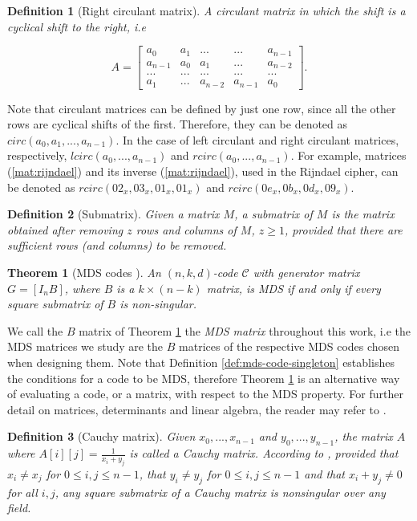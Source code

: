 \documentclass{report}
\newtheorem{definition}{Definition}{\bfseries}{\itshape}
\newtheorem{theorem}{Theorem}{\bfseries}{\itshape}
\begin{document}
\begin{definition}[Right circulant matrix]
A circulant matrix in which the shift is a cyclical shift to the right, i.e

$$
A = 
\begin{bmatrix}
a_0 & a_1 & ... & ... & a_{n-1}\\
a_{n-1} & a_0 & a_1 & ... & a_{n-2}\\
... & ... & ... & ... & ...\\
a_1 & ... & a_{n-2} & a_{n-1} & a_0
\end{bmatrix}.
$$
\end{definition}

Note that circulant matrices can be defined by just one row, since all the other rows are cyclical shifts of the first. Therefore, they can be denoted as $circ(a_0, a_1, ..., a_{n-1})$. In the case of left circulant and right circulant matrices, respectively, $lcirc(a_0, ..., a_{n-1})$ and $rcirc(a_0, ..., a_{n-1})$. For example, matrices (\ref{mat:rijndael}) and its inverse (\ref{mat:rijndael}), used in the Rijndael cipher, can be denoted as $rcirc(02_x, 03_x, 01_x, 01_x)$ and $rcirc(0e_x, 0b_x, 0d_x, 09_x)$.

\begin{definition}[Submatrix]
Given a matrix $M$, a submatrix of $M$ is the matrix obtained after removing $z$ rows and columns of $M$, $z \geq 1$, provided that there are sufficient rows (and columns) to be removed.
\end{definition}

\begin{theorem}[MDS codes \cite{SloaneBook}]\label{teo:mds}
An $(n, k, d)$-code $\mathcal{C}$ with generator matrix $G = [I_nB]$, where $B$ is a $k \times (n - k)$ matrix, is MDS if and only if every square submatrix of $B$ is non-singular.
\end{theorem}

We call the $B$ matrix of Theorem \ref{teo:mds} the \emph{MDS matrix} throughout this work, i.e the MDS matrices we study are the $B$ matrices of the respective MDS codes chosen when designing them.
Note that Definition \ref{def:mds-code-singleton} establishes the conditions for a code to be MDS, therefore Theorem \ref{teo:mds} is an alternative way of evaluating a code, or a matrix, with respect to the MDS property.
For further detail on matrices, determinants and linear algebra, the reader may refer to \cite{LangeLinearAlgebra}.

\begin{definition}[Cauchy matrix]\label{def:cauchy}
Given $x_0, ..., x_{n-1}$ and $y_0, ..., y_{n-1}$, the matrix $A$ where $A[i][j] = \frac{1}{x_i + y_j}$ is called a Cauchy matrix. According to \cite{Youssef1997}, provided that $x_i \neq x_j$ for $0\leq i,j\leq n-1$, that $y_i \neq y_j$ for $0\leq i,j\leq n-1$ and that $x_i + y_j \neq 0$ for all $i, j$, any square submatrix of a Cauchy matrix is nonsingular over any field.
\end{definition}
\end{document}
